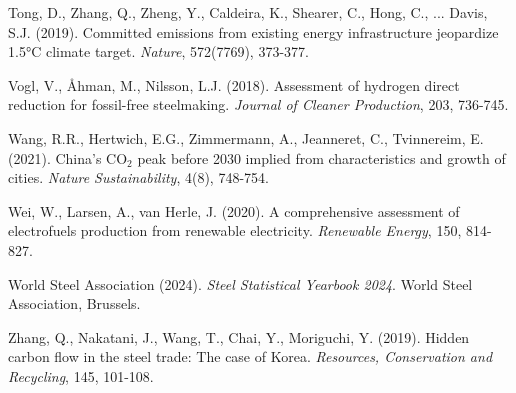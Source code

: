 \documentclass[preprint,1p,authoryear]{elsarticle}
\begin{document}
\begin{thebibliography}{99}
 Tong, D., Zhang, Q., Zheng, Y., Caldeira, K., Shearer, C., Hong, C., ... Davis, S.J. (2019). Committed emissions from existing energy infrastructure jeopardize 1.5°C climate target. \textit{Nature}, 572(7769), 373-377.

 Vogl, V., Åhman, M., Nilsson, L.J. (2018). Assessment of hydrogen direct reduction for fossil-free steelmaking. \textit{Journal of Cleaner Production}, 203, 736-745.

 Wang, R.R., Hertwich, E.G., Zimmermann, A., Jeanneret, C., Tvinnereim, E. (2021). China's CO$_2$ peak before 2030 implied from characteristics and growth of cities. \textit{Nature Sustainability}, 4(8), 748-754.

 Wei, W., Larsen, A., van Herle, J. (2020). A comprehensive assessment of electrofuels production from renewable electricity. \textit{Renewable Energy}, 150, 814-827.

 World Steel Association (2024). \textit{Steel Statistical Yearbook 2024}. World Steel Association, Brussels.

 Zhang, Q., Nakatani, J., Wang, T., Chai, Y., Moriguchi, Y. (2019). Hidden carbon flow in the steel trade: The case of Korea. \textit{Resources, Conservation and Recycling}, 145, 101-108.

\end{thebibliography}
\end{document}
